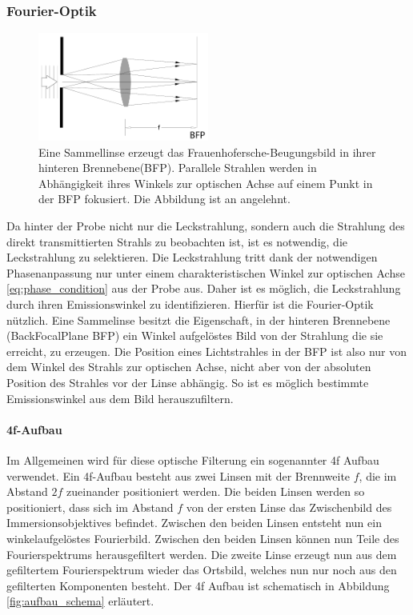 \documentclass{article}
\begin{document}
	\subsubsection{Fourier-Optik}
		\begin{figure}[htbp] 
		\centering
		\includegraphics[width=0.5\textwidth]{figures/FourierLinse.pdf}
		\caption{Eine Sammellinse erzeugt das Frauenhofersche-Beugungsbild in ihrer hinteren Brennebene(BFP). Parallele Strahlen werden in Abhängigkeit ihres Winkels zur optischen Achse auf einem Punkt in der BFP fokusiert. Die Abbildung ist an \cite{Hecht.2018} angelehnt.}
		\label{fig:FourierLinse}
	\end{figure}
	Da hinter der Probe nicht nur die Leckstrahlung, sondern auch die Strahlung des direkt transmittierten Strahls zu beobachten ist, ist es notwendig, die Leckstrahlung zu selektieren. Die Leckstrahlung tritt dank der notwendigen Phasenanpassung nur unter einem charakteristischen Winkel zur optischen Achse \eqref{eq:phase_condition} aus der Probe aus. Daher ist es möglich, die Leckstrahlung durch ihren Emissionswinkel zu identifizieren. Hierfür ist die Fourier-Optik nützlich. Eine Sammelinse besitzt die Eigenschaft, in  der hinteren Brennebene (BackFocalPlane BFP) ein Winkel aufgelöstes Bild von der Strahlung die sie erreicht, zu erzeugen.\cite{Hecht.1996} Die Position eines Lichtstrahles in der BFP ist also nur von dem Winkel des Strahls zur optischen Achse, nicht aber von der absoluten Position des Strahles vor der Linse abhängig. So ist es möglich bestimmte Emissionswinkel aus dem Bild herauszufiltern.
	
	\paragraph{4f-Aufbau}
		Im Allgemeinen wird für diese optische Filterung ein sogenannter 4f Aufbau verwendet. Ein 4f-Aufbau besteht aus zwei Linsen mit der Brennweite $f$, die im Abstand $2f$ zueinander positioniert werden. Die beiden Linsen werden so positioniert, dass sich im Abstand $f$ von der ersten Linse das Zwischenbild des Immersionsobjektives befindet. Zwischen den beiden Linsen entsteht nun ein winkelaufgelöstes Fourierbild. Zwischen den beiden Linsen können nun Teile des Fourierspektrums herausgefiltert werden. Die zweite Linse erzeugt nun aus dem gefiltertem Fourierspektrum wieder das Ortsbild, welches nun nur noch aus den gefilterten Komponenten besteht. Der 4f Aufbau ist schematisch in Abbildung \ref{fig:aufbau_schema} erläutert.
\end{document}
